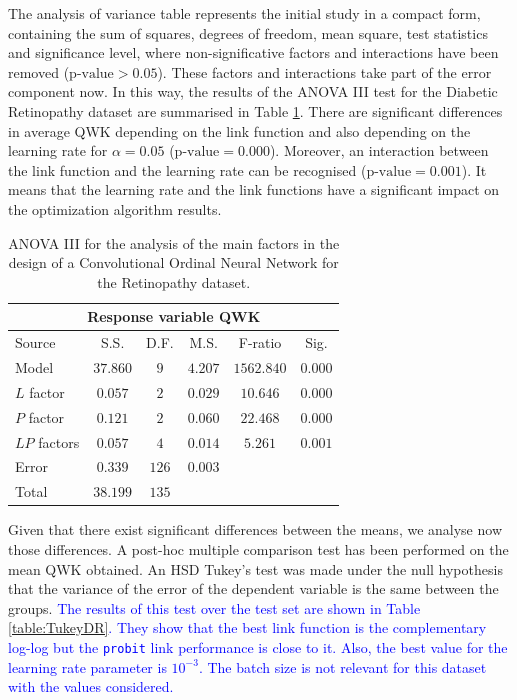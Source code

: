 \documentclass[journal]{IEEEtran}
\begin{document}
	The analysis of variance table represents the initial study in a compact form, containing the sum of squares, degrees of freedom, mean square, test statistics and significance level, where non-significative factors and interactions have been removed ($\text{p-value} > 0.05$). These factors and interactions take part of the error component now. In this way, the results of the ANOVA III test for the Diabetic Retinopathy dataset are summarised in Table  \ref{table:ANOVARetinopathy}. There are significant differences in average QWK depending on the link function and also depending on the learning rate for $\alpha=0.05$ ($\text{p-value} = 0.000$). Moreover, an interaction between the link function and the learning rate can be recognised ($\text{p-value} = 0.001$). It means that the learning rate and the link functions have a significant impact on the optimization algorithm results.
		
	\begin{table}[!t]
		\caption{ANOVA III for the analysis of the main factors in the design of a Convolutional Ordinal Neural Network for the Retinopathy dataset.}
		\label{table:ANOVARetinopathy}
		\centering
		\small
		\begin{tabular}{lccccc}
			\hline
			\hline
			           \multicolumn{6}{c}{Response variable QWK}             \\ \hline
			Source       &   S.S.   & D.F.  &  M.S.   &  F-ratio   &  Sig.   \\ \hline
			Model        & $37.860$ &  $9$  & $4.207$ & $1562.840$ & $0.000$ \\
			$L$ factor   & $0.057$  &  $2$  & $0.029$ &  $10.646$  & $0.000$ \\
			$P$ factor   & $0.121$  &  $2$  & $0.060$ &  $22.468$  & $0.000$ \\
			$LP$ factors & $0.057$  &  $4$  & $0.014$ &  $5.261$   & $0.001$ \\
			Error        & $0.339$  & $126$ & $0.003$ &            &  \\ \hline
			Total        & $38.199$ & $135$ &         &            & \\
			\hline
			\hline
		\end{tabular}
	\end{table}
	
	Given that there exist significant differences between the means, we analyse now those differences. A post-hoc multiple comparison test has been performed on the mean QWK obtained. An HSD Tukey's test \cite{tukey1949comparing} was made under the null hypothesis that the variance of the error of the dependent variable is the same between the groups. \textcolor{blue}{The results of this test over the test set are shown in Table \ref{table:TukeyDR}. They show that the best link function is the complementary log-log but the \texttt{probit} link performance is close to it. Also, the best value for the learning rate parameter is $10^{-3}$. The batch size is not relevant for this dataset with the values considered.}
	
\end{document}
